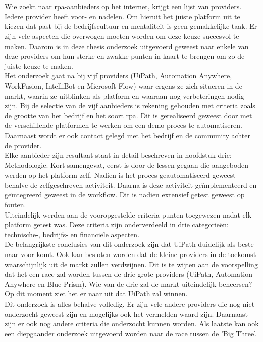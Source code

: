 \chapter*{}
Wie zoekt naar \acrshort{rpa}-aanbieders op het internet, krijgt een lijst van providers. Iedere provider heeft voor- en nadelen. Om hieruit het juiste platform uit te kiezen dat past bij de bedrijfscultuur en mentaliteit is geen gemakkelijke taak. Er zijn vele aspecten die overwogen moeten worden om deze keuze succesvol te maken. Daarom is in deze thesis onderzoek uitgevoerd geweest naar enkele van deze providers om hun sterke en zwakke punten in kaart te brengen om zo de juiste keuze te maken.\\
Het onderzoek gaat na bij vijf providers (UiPath, Automation Anywhere, WorkFusion, IntelliBot en Microsoft Flow) waar ergens ze zich situeren in de markt, waarin ze uitblinken als platform en waaraan nog verbeteringen nodig zijn. Bij de selectie van de vijf aanbieders is rekening gehouden met criteria zoals de grootte van het bedrijf en het soort \acrshort{rpa}. Dit is gerealiseerd geweest door met de verschillende platformen te werken om een demo proces te automatiseren. Daarnaast wordt er ook contact gelegd met het bedrijf en de community achter de provider.\\
Elke aanbieder zijn resultaat staat in detail beschreven in hoofdstuk drie: Methodologie. Kort samengevat, eerst is door de lessen gegaan die aangeboden werden op het platform zelf. Nadien is het proces geautomatiseerd geweest behalve de zelfgeschreven \gls{activiteit}. Daarna is deze \gls{activiteit} geïmplementeerd en geïntegreerd geweest in de \gls{workflow}. Dit is nadien extensief getest geweest op fouten.\\
Uiteindelijk werden aan de vooropgestelde criteria punten toegewezen nadat elk platform getest was. Deze criteria zijn onderverdeeld in drie categorieën: technische-, bedrijfs- en financiële aspecten.\\
De belangrijkste conclusies van dit onderzoek zijn dat UiPath duidelijk als beste naar voor komt. Ook kan besloten worden dat de kleine providers in de toekomst waarschijnlijk uit de markt zullen verdwijnen. Dit is te wijten aan de voorspelling dat het een race zal worden tussen de drie grote providers (UiPath, Automation Anywhere en Blue Prism). Wie van de drie zal de markt uiteindelijk beheersen? Op dit moment ziet het er naar uit dat UiPath zal winnen.\\
Dit onderzoek is alles behalve volledig. Er zijn vele andere providers die nog niet onderzocht geweest zijn en mogelijks ook het vermelden waard zijn. Daarnaast zijn er ook nog andere criteria die onderzocht kunnen worden. Als laatste kan ook een diepgaander onderzoek uitgevoerd worden naar de race tussen de 'Big Three'.